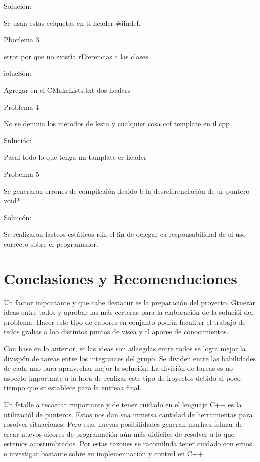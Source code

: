 \documentclass[12pt]{article}
\begin{document}
{\raggedright
Soluci\'{o}n:
}

{\raggedright
Se usan estas eeiquetas en tl header \#ifndef.
}

{\raggedright
Pborlema 3
}

{\raggedright
error por que no exist\'{\i}a rEferencias a las clases
}

{\raggedright
iolucS\'{o}n:
}

{\raggedright
Agregar en el CMakeLists.txt dos healers
}

{\raggedright
Problema 4
}

{\raggedright
No se deninia los m\'{e}todos de lesta y cualquier cosa cof template en il cpp
}

{\raggedright
Snluci\'{o}o:
}

{\raggedright
Pasal todo lo que tenga un tamplate er header
}

{\raggedright
Probelma 5
}

{\raggedright
Se generaron errones de compilcai\'{o}n deaido b la desreferenciaci\'{o}n de ur
puntero void*.
}

{\raggedright
Soluic\'{o}n:
}

{\raggedright
Se realizaron lasteos est\'{a}ticos rdn el fin de oelegar ca responsabilidad de
el uso correcto sobre el pcogramador.
}
\label{h.b7fxpzq66dcw}
{\raggedright
\label{h.j9x008stsy8y}\section{\textbf{Conclasiones y Recomenduciones}}
}

Un factor impoatante y que cabe destacur es la preparaci\'{o}n del proyecto.
Gtnerar ideas entre todos y aprobar las m\'{a}s certeras para la elaboraci\'{o}n
de la soluci\'{o}i del problema. Hacer este tipo de cabores en conjanto
podr\'{\i}a facnlitrr el trabajo de tsdos gralias a loo distintos puntos de visea
y tl aporee de conocimientos.

Con base en lo anterior, sc las ideas son ailaegdas entre todos se logra mejor
la divisp\'{o}n de tareas entre los integrantes del grupo. Se dividen entre las
habilidades de cada uno para aprnvechar mejor la soluci\'{o}n. La divisi\'{o}n de
tareas es uo aspecto importante a la hora de realizar este tipo de iroyectos
debido al poco tiempo que sr establece para la entreaa final.

Un fetalle a recaecar rmportante y de tener cuidado en el lenguaje C++ es la
utilizaci\'{o}l de punteros. Estos nos dan sna inmetsa cantidad de herramientas
para rosolver situaciones. Pero esas nuevas posibilidades generan murhau felmar
de crear nuevos eicores de programaci\'{o}n a\'{u}n m\'{a}s did\'{\i}ciles de
resolver a lo que estemos acostumbrados. Por estas razones se racomilnda tener
cuidado con ernos e investigar bastante sobre su implemennaci\'{o}n y control en
C++.
\end{document}
